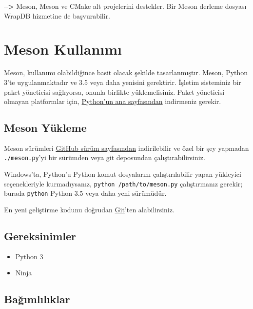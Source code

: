 \documentclass[
]{book}
\providecommand{\tightlist}{%
  \setlength{\itemsep}{0pt}\setlength{\parskip}{0pt}}
\begin{document}
\textbf{--\textgreater{}} Meson, Meson ve CMake alt projelerini destekler. Bir Meson derleme dosyası WrapDB hizmetine de başvurabilir.

\hypertarget{meson-kullanux131mux131}{%
\section{Meson Kullanımı}\label{meson-kullanux131mux131}}

Meson, kullanımı olabildiğince basit olacak şekilde tasarlanmıştır.
Meson, Python 3'te uygulanmaktadır ve 3.5 veya daha yenisini gerektirir. İşletim sisteminiz bir paket yöneticisi sağlıyorsa, onunla birlikte yüklemelisiniz. Paket yöneticisi olmayan platformlar için,
\href{https://www.python.org/downloads/}{Python'un ana sayfasından} indirmeniz gerekir.

\hypertarget{meson-yuxfckleme}{%
\subsection{Meson Yükleme}\label{meson-yuxfckleme}}

Meson sürümleri \href{https://github.com/mesonbuild/meson/releases}{GitHub sürüm sayfasından} indirilebilir ve özel bir şey yapmadan \texttt{./meson.py}'yi bir sürümden veya git deposundan çalıştırabilirsiniz.

Windows'ta, Python'u Python komut dosyalarını çalıştırılabilir yapan yükleyici seçenekleriyle kurmadıysanız, \texttt{python\ /path/to/meson.py} çalıştırmanız gerekir; burada \texttt{python} Python 3.5 veya daha yeni sürümüdür.

En yeni geliştirme kodunu doğrudan \href{https://github.com/mesonbuild/meson}{Git}'ten alabilirsiniz.

\hypertarget{gereksinimler}{%
\subsection{Gereksinimler}\label{gereksinimler}}

\begin{itemize}
\tightlist
\item
  Python 3
\item
  Ninja
\end{itemize}

\hypertarget{baux11fux131mlux131lux131klar}{%
\subsection{Bağımlılıklar}\label{baux11fux131mlux131lux131klar}}
\end{document}
